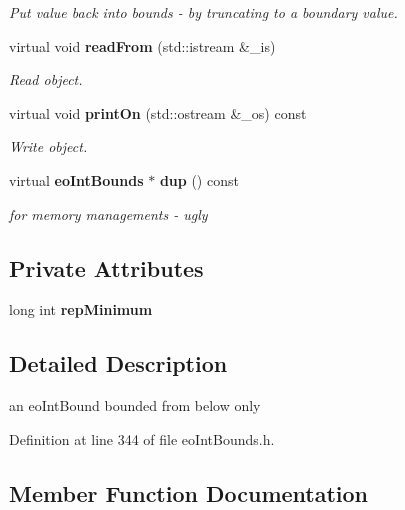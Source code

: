 \begin{CompactItemize}
\begin{CompactList}\small\item\em Put value back into bounds - by truncating to a boundary value. \item\end{CompactList}\item 
virtual void {\bf read\-From} (std::istream \&\_\-is)
\begin{CompactList}\small\item\em Read object. \item\end{CompactList}\item 
virtual void {\bf print\-On} (std::ostream \&\_\-os) const 
\begin{CompactList}\small\item\em Write object. \item\end{CompactList}\item 
virtual {\bf eo\-Int\-Bounds} $\ast$ {\bf dup} () const \label{classeo_int_below_bound_a16}

\begin{CompactList}\small\item\em for memory managements - ugly \item\end{CompactList}\end{CompactItemize}
\subsection*{Private Attributes}
\begin{CompactItemize}
\item 
long int {\bf rep\-Minimum}\label{classeo_int_below_bound_r0}

\end{CompactItemize}


\subsection{Detailed Description}
an eo\-Int\-Bound bounded from below only 



Definition at line 344 of file eo\-Int\-Bounds.h.

\subsection{Member Function Documentation}
